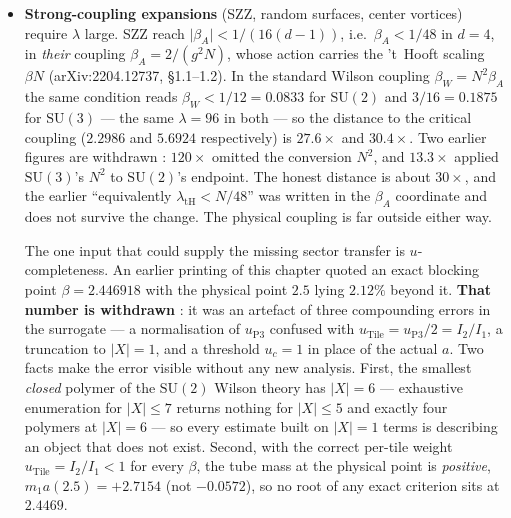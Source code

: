 \begin{itemize}
  What a constant-improvement programme can reach is now a number \LM: the loosest link is L2, the
  polymer/cluster estimate, where the block-union bound gives way to Koteck\'y--Preiss polymer
  counting for exactly $4/3$ ($c^*:19.90\to14.93$, $N=3$); the next loosest is L3's crude
  $K=80e^{2+\beta}N$, bounded by $\le10$ and \emph{not} quantified. Hence
  $M=(4/3)\times[1,10]\in[1.3,13]$, i.e.\ $10^{0.5}$--$10^{1}$: this arithmetic supports
  $2.47\times$ and does \emph{not} support $18\times$. The limit $\lambda\sim1$ is a \emph{parameter}
  limit and a statement about the \emph{shape} of the theorem, not a slack \LM: L4 is the
  spectral equality $\lambda_{\min}=(4/a^2)\sin^2(\pi a/L)$, attained by the lowest nonzero mode,
  and L5 is power counting --- those two links are genuinely optimal, so no constant improvement
  acts on them \LT{} --- while L6 is a hypothesis
  $\gamma$ on the effective-coupling sequence rather than a bound.
\item \textbf{Strong-coupling expansions} (SZZ, random surfaces, center vortices) require
  $\lambda$ large. SZZ reach $\lvert\beta_A\rvert<1/(16(d-1))$, i.e.\ $\beta_A<1/48$ in $d=4$, in
  \emph{their} coupling $\beta_A=2/(g^2N)$, whose action carries the 't~Hooft scaling $\beta N$
  (arXiv:2204.12737, \S1.1--1.2). In the standard Wilson coupling $\beta_W=N^2\beta_A$ the same
  condition reads $\beta_W<1/12=0.0833$ for $\mathrm{SU}(2)$ and $3/16=0.1875$ for $\mathrm{SU}(3)$
  --- the same $\lambda=96$ in both --- so the distance to the critical coupling ($2.2986$ and
  $5.6924$ respectively) is $27.6\times$ and $30.4\times$. Two earlier figures are withdrawn \LE:
  $120\times$ omitted the conversion $N^2$, and $13.3\times$ applied $\mathrm{SU}(3)$'s $N^2$ to
  $\mathrm{SU}(2)$'s endpoint. The honest distance is about $30\times$, and the earlier ``equivalently
  $\lambda_{\mathrm{tH}}<N/48$'' was written in the $\beta_A$ coordinate and does not survive the
  change. The physical coupling is far outside either way.

  The one input that could supply the missing sector transfer is $u$-completeness. An earlier printing
  of this chapter quoted an exact blocking point $\beta=2.446918$ with the physical point $2.5$ lying
  $2.12\%$ beyond it. \textbf{That number is withdrawn} \LN: it was an artefact of three compounding
  errors in the surrogate --- a normalisation of $u_{\mathrm{P3}}$ confused with $u_{\mathrm{Tile}}
  =u_{\mathrm{P3}}/2=I_2/I_1$, a truncation to $|X|=1$, and a threshold $u_c=1$ in place of the actual
  $a$. Two facts make the error visible without any new analysis. First, the smallest \emph{closed}
  polymer of the $\mathrm{SU}(2)$ Wilson theory has $|X|=6$ --- exhaustive enumeration for $|X|\le7$
  returns nothing for $|X|\le5$ and exactly four polymers at $|X|=6$ --- so every estimate built on
  $|X|=1$ terms is describing an object that does not exist. Second, with the correct per-tile weight
  $u_{\mathrm{Tile}}=I_2/I_1<1$ for every $\beta$, the tube mass at the physical point is
  \emph{positive}, $m_1a(2.5)=+2.7154$ (not $-0.0572$), so no root of any exact criterion sits at
  $2.4469$.


\end{itemize}
